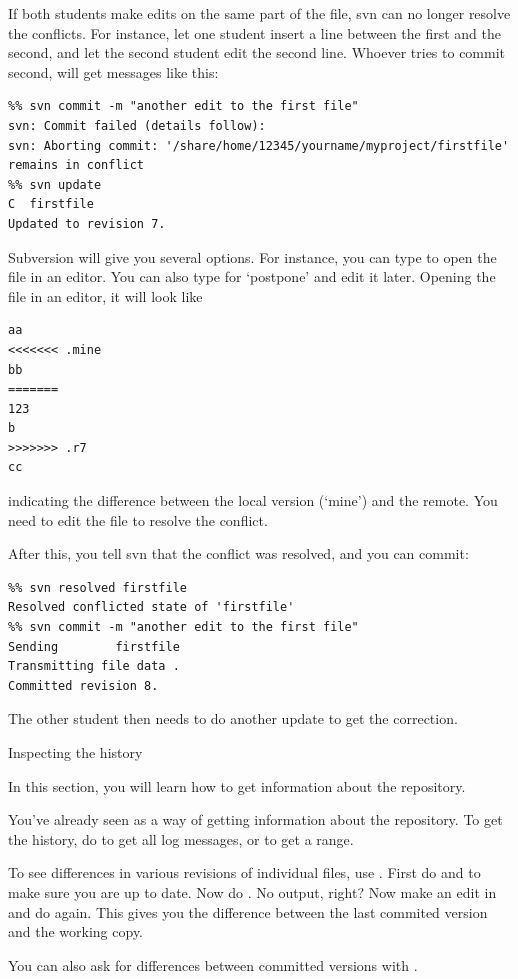 If both students make edits on the same part of the file, svn can no
longer resolve the conflicts. For instance, let one student insert a
line between the first and the second, and let the second student edit
the second line. Whoever tries to commit second, will get messages
like this:
\begin{verbatim}
%% svn commit -m "another edit to the first file"
svn: Commit failed (details follow):
svn: Aborting commit: '/share/home/12345/yourname/myproject/firstfile' 
remains in conflict
%% svn update
C  firstfile
Updated to revision 7.
\end{verbatim}
Subversion will give you several options. For instance, you can type
 to open the file in an editor. You can also type  for
`postpone' and edit it later.
Opening the file in an editor, it will look like
\begin{verbatim}
aa
<<<<<<< .mine
bb
=======
123
b
>>>>>>> .r7
cc
\end{verbatim}
indicating the difference between the local version (`mine') and the
remote. You need to edit the file to resolve the conflict.

After this, you tell svn that the conflict was resolved, and
you can commit:
\begin{verbatim}
%% svn resolved firstfile
Resolved conflicted state of 'firstfile'
%% svn commit -m "another edit to the first file"
Sending        firstfile
Transmitting file data .
Committed revision 8.
\end{verbatim}
The other student then needs to do another update to get the
correction.

 {Inspecting the history}

\begin{purpose}
  In this section, you will learn how to get information about the repository.
\end{purpose}

You've already seen  as a way of getting information
about the repository. To get the history, do  to get all
log messages, or  to get a range.

To see differences in various revisions of individual files, use
. First do  and  to
make sure you are up to date. Now do . No
output, right? Now make an edit in  and do  again. This gives you the difference between the last
commited version and the working copy.

You can also ask for differences between committed versions with
.

